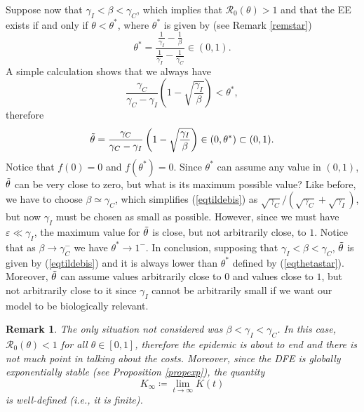 \documentclass[11pt,reqno]{amsart}
\theoremstyle{boldremark}
\newtheorem{remark}{Remark}
\begin{document}
Suppose now that $\gamma_I < \beta < \gamma_C$, which implies that $\mathcal{R}_0(\theta) > 1$ and that the EE exists if and only if $\theta<\theta^*$, where $\theta^*$ is given by (see Remark \ref{remstar}) 
\begin{equation} \label{eqthetastar}
    \theta^* = \frac{\frac{1}{\gamma_I}-\frac{1}{\beta}}{\frac{1}{\gamma_I}-\frac{1}{\gamma_C}} \in (0,1). 
\end{equation} 
A simple calculation shows that we always have 
\begin{equation*}
    \frac{\gamma_C}{\gamma_C - \gamma_I} \left(1 - \sqrt{\frac{\gamma_I}{\beta}}\right) < \theta^*, 
\end{equation*}
therefore 
\begin{equation} \label{eqtildebis}
    \Tilde{\theta} = \frac{\gamma_C}{\gamma_C - \gamma_I} \left(1 - \sqrt{\frac{\gamma_I}{\beta}}\right) \in (0,\theta^*) \subset (0,1).  
\end{equation}
Notice that $f(0)=0$ and $f(\theta^*)=0$. Since $\theta^*$ can assume any value in $(0,1)$, $\Tilde{\theta}$ can be very close to zero, but what is its maximum possible value? Like before, we have to choose $\beta \simeq \gamma_C$, which simplifies (\ref{eqtildebis}) as $\sqrt{\gamma_C} / (\sqrt{\gamma_C} + \sqrt{\gamma_I})$, but now $\gamma_I$ must be chosen as small as possible.  However, since we must have $\varepsilon \ll \gamma_I$, the maximum value for $\Tilde{\theta}$ is close, but not arbitrarily close, to $1$. Notice that as $\beta \to \gamma_C^-$ we have $\theta^* \to 1^-$. In conclusion, supposing that $\gamma_I < \beta < \gamma_C$, $\Tilde{\theta}$ is given by (\ref{eqtildebis}) and it is always lower than $\theta^*$ defined by (\ref{eqthetastar}). Moreover, $\Tilde{\theta}$ can assume values arbitrarily close to $0$ and values close to $1$, but not arbitrarily close to it since $\gamma_I$ cannot be arbitrarily small if we want our model to be biologically relevant. 

\begin{remark}
    The only situation not considered was $\beta < \gamma_I < \gamma_C$. In this case, $\mathcal{R}_0(\theta) < 1$ for all $\theta \in [0,1]$, therefore the epidemic is about to end and there is not much point in talking about the costs. Moreover, since the DFE is globally exponentially stable (see Proposition \ref{propexp}), the quantity 
    \begin{equation*}
        K_\infty \coloneqq \lim_{t \to \infty} K(t) 
    \end{equation*}
    is well-defined (i.e., it is finite). 
\end{remark}
\end{document}
